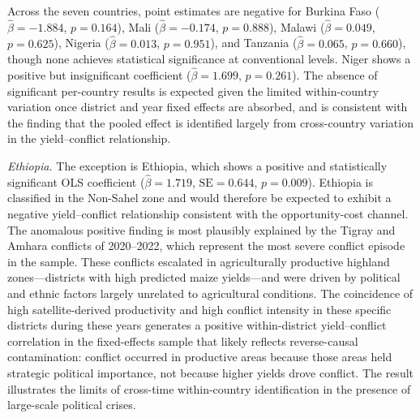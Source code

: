 \begin{table}[H]
\centering
\caption{Per-Country TWFE Poisson: Effect of Predicted Yield on Conflict}
\label{tab:country_poisson}
\begin{threeparttable}

\end{threeparttable}
\end{table}

Across the seven countries, point estimates are negative for Burkina Faso ($\hat{\beta} = -1.884$, $p = 0.164$), Mali ($\hat{\beta} = -0.174$, $p = 0.888$), Malawi ($\hat{\beta} = 0.049$, $p = 0.625$), Nigeria ($\hat{\beta} = 0.013$, $p = 0.951$), and Tanzania ($\hat{\beta} = 0.065$, $p = 0.660$), though none achieves statistical significance at conventional levels. Niger shows a positive but insignificant coefficient ($\hat{\beta} = 1.699$, $p = 0.261$). The absence of significant per-country results is expected given the limited within-country variation once district and year fixed effects are absorbed, and is consistent with the finding that the pooled effect is identified largely from cross-country variation in the yield--conflict relationship.

\textit{Ethiopia.} The exception is Ethiopia, which shows a positive and statistically significant OLS coefficient ($\hat{\beta} = 1.719$, $\text{SE} = 0.644$, $p = 0.009$). Ethiopia is classified in the Non-Sahel zone and would therefore be expected to exhibit a negative yield--conflict relationship consistent with the opportunity-cost channel. The anomalous positive finding is most plausibly explained by the Tigray and Amhara conflicts of 2020--2022, which represent the most severe conflict episode in the sample. These conflicts escalated in agriculturally productive highland zones---districts with high predicted maize yields---and were driven by political and ethnic factors largely unrelated to agricultural conditions. The coincidence of high satellite-derived productivity and high conflict intensity in these specific districts during these years generates a positive within-district yield--conflict correlation in the fixed-effects sample that likely reflects reverse-causal contamination: conflict occurred in productive areas because those areas held strategic political importance, not because higher yields drove conflict. The result illustrates the limits of cross-time within-country identification in the presence of large-scale political crises.
